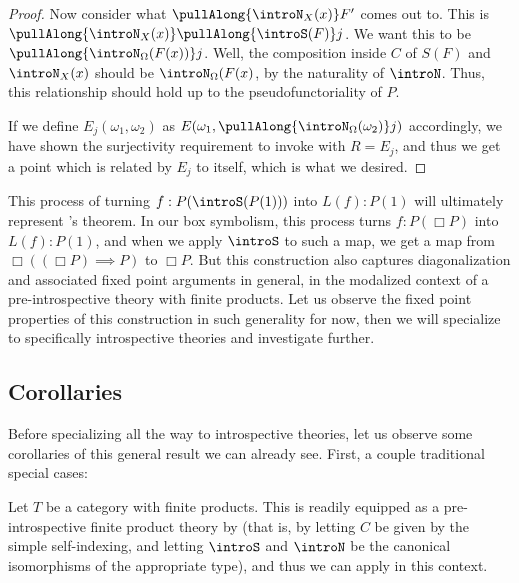 \begin{proof}
Now consider what $\pullAlong{\introN_{X}(x)} F'$ comes out to. This is $\pullAlong{\introN_{X}(x)} \pullAlong{\introS(F)} j$. We want this to be $\pullAlong{\introN_{\Omega}(F(x))} j$. Well, the composition inside $C$ of $S(F)$ and $\introN_{X}(x)$ should be $\introN_{\Omega}(F(x)$, by the naturality of $\introN$. Thus, this relationship should hold up to the pseudofunctoriality of $P$. \TODO

If we define $E_j(\omega_1, \omega_2)$ as $E(\omega_1, \pullAlong{\introN_{\Omega}(\omega_2)} j)$ accordingly, we have shown the surjectivity requirement to invoke  with $R = E_j$, and thus we get a point which is related by $E_j$ to itself, which is what we desired.

\end{proof}

This process of turning $f: P(\introS(P(1)))$ into $L(f): P(1)$ will ultimately represent \Loeb's theorem. In our box symbolism, this process turns $f : P(\Box P)$ into $L(f) : P(1)$, and when we apply $\introS$ to such a map, we get a map from $\Box((\Box P) \implies P)$ to $\Box P$. But this construction also captures diagonalization and associated fixed point arguments in general, in the modalized context of a pre-introspective theory with finite products. Let us observe the fixed point properties of this construction in such generality for now, then we will specialize to specifically introspective theories and investigate further.


\subsection{Corollaries}
Before specializing all the way to introspective theories, let us observe some corollaries of this general result we can already see. First, a couple traditional special cases:

\label{LawveresTheoremViaPreIntrospective}
Let $T$ be a category with finite products. This is readily equipped as a pre-introspective finite product theory by  (that is, by letting $C$ be given by the simple self-indexing, and letting $\introS$ and $\introN$ be the canonical isomorphisms of the appropriate type), and thus we can apply  in this context.

